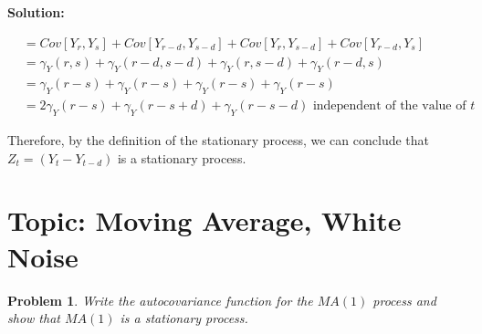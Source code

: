 \documentclass[11pt]{article}
\theoremstyle{plain} %
\newtheorem{problem}[theorem]{Problem}
\newenvironment{solution}
{\color{C2}\normalfont\begin{framed}\begingroup\textbf{Solution:} }
  {\endgroup\end{framed}}
\theoremstyle{remark}
\begin{document}
\begin{solution}
\begin{enumerate}[label = (\alph*)]
{\begin{enumerate}[label=(\roman*)]
{\begin{align*}
				                            & = Cov[Y_{r}, Y_{s}] + Cov[Y_{r-d}, Y_{s-d}] + Cov[Y_{r}, Y_{s-d}] + Cov[Y_{r-d}, Y_{s}]                              \\
				                            & = \gamma_{Y}(r, s) + \gamma_{Y}(r-d, s-d) + \gamma_{Y}(r, s-d) + \gamma_{Y}(r-d, s)                                  \\
				                            & = \gamma_{Y}(r-s) + \gamma_{Y}(r-s) + \gamma_{Y}(r-s) + \gamma_{Y}(r-s)                                              \\
				                            & = 2\gamma_{Y}(r-s) + \gamma_{Y}(r-s+d) + \gamma_{Y}(r-s-d)  \text{ independent of the value of } t
			            \end{align*}
			            }\end{enumerate}
		      Therefore, by the definition of the stationary process, we can conclude that $Z_t=\left(Y_{t}-Y_{t-d}\right)$ is a stationary process.

		      }\end{enumerate}
\end{solution}


\section{Topic: Moving Average, White Noise}
\begin{problem}
Write the autocovariance function for the $MA(1)$ process and show that $MA(1)$ is a stationary process.
\end{problem}
\end{document}
